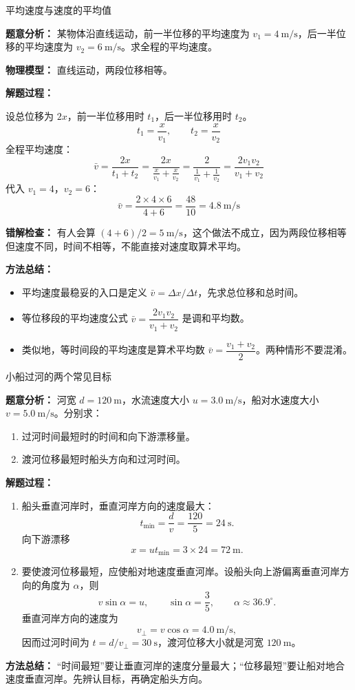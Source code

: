 \begin{examplebox}{平均速度与速度的平均值}

\textbf{题意分析：} 某物体沿直线运动，前一半位移的平均速度为 $v_1 = 4\ \mathrm{m/s}$，后一半位移的平均速度为 $v_2 = 6\ \mathrm{m/s}$。求全程的平均速度。

\textbf{物理模型：} 直线运动，两段位移相等。

\textbf{解题过程：}

设总位移为 $2x$，前一半位移用时 $t_1$，后一半位移用时 $t_2$。
\[
t_1 = \frac{x}{v_1},\qquad t_2 = \frac{x}{v_2}
\]
全程平均速度：
\[
\bar{v} = \frac{2x}{t_1 + t_2} = \frac{2x}{\frac{x}{v_1} + \frac{x}{v_2}} = \frac{2}{\frac{1}{v_1} + \frac{1}{v_2}} = \frac{2v_1 v_2}{v_1 + v_2}
\]
代入 $v_1 = 4$，$v_2 = 6$：
\[
\bar{v} = \frac{2 \times 4 \times 6}{4 + 6} = \frac{48}{10} = 4.8\ \mathrm{m/s}
\]

\textbf{错解检查：} 有人会算 $(4 + 6)/2 = 5\ \mathrm{m/s}$，这个做法不成立，因为两段位移相等但速度不同，时间不相等，不能直接对速度取算术平均。

\textbf{方法总结：}
\begin{itemize}
  \item 平均速度最稳妥的入口是定义 $\bar{v} = \Delta x / \Delta t$，先求总位移和总时间。
  \item 等位移段的平均速度公式 $\bar{v} = \dfrac{2v_1v_2}{v_1+v_2}$ 是调和平均数。
  \item 类似地，等时间段的平均速度是算术平均数 $\bar{v} = \dfrac{v_1+v_2}{2}$。两种情形不要混淆。
\end{itemize}

\end{examplebox}

\begin{examplebox}{小船过河的两个常见目标}

\textbf{题意分析：} 河宽 $d=120\ \mathrm m$，水流速度大小
$u=3.0\ \mathrm{m/s}$，船对水速度大小 $v=5.0\ \mathrm{m/s}$。分别求：
\begin{enumerate}
  \item 过河时间最短时的时间和向下游漂移量。
  \item 渡河位移最短时船头方向和过河时间。
\end{enumerate}

\textbf{解题过程：}
\begin{enumerate}
  \item 船头垂直河岸时，垂直河岸方向的速度最大：
  \[
  t_{\min}=\frac{d}{v}=\frac{120}{5}=24\ \mathrm s.
  \]
  向下游漂移
  \[
  x=ut_{\min}=3\times24=72\ \mathrm m.
  \]

  \item 要使渡河位移最短，应使船对地速度垂直河岸。设船头向上游偏离垂直河岸方向的角度为 $\alpha$，则
  \[
  v\sin\alpha=u,\qquad
  \sin\alpha=\frac35,\qquad
  \alpha\approx36.9^\circ.
  \]
  垂直河岸方向的速度为
  \[
  v_\perp=v\cos\alpha=4.0\ \mathrm{m/s},
  \]
  因而过河时间为 $t=d/v_\perp=30\ \mathrm s$，渡河位移大小就是河宽
  $120\ \mathrm m$。
\end{enumerate}

\textbf{方法总结：} “时间最短”要让垂直河岸的速度分量最大；“位移最短”要让船对地合速度垂直河岸。先辨认目标，再确定船头方向。
\end{examplebox}


